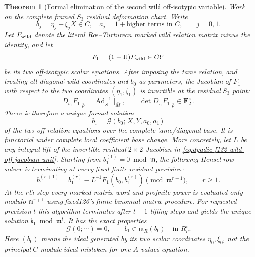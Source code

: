 \documentclass[11pt]{article}
\newtheorem{theorem}{Theorem}[section]
\theoremstyle{definition}
\begin{document}
\begin{theorem}[Formal elimination of the second wild off-isotypic variable]
\label{thm:dyadic-f132-formal-wild-elimination}
Work on the complete
framed $S_3$ residual
deformation chart.
Write
\[
b_j=\eta_j+\xi_jX\in C,
\quad
a_j=1+\text{higher terms in }C,
\qquad j=0,1.
\]
Let $F_{\rm wild}$ denote
the \emph{literal}
Roe--Turturean marked
wild relation matrix
minus the identity,
and let
\[
F_1=(1-\Pi)F_{\rm wild}
\in CY
\]
be its two
off-isotypic scalar
equations.
After imposing the
tame relation, and
treating all diagonal
wild coordinates
and $b_0$ as
parameters, the
Jacobian of $F_1$
with respect to
the two coordinates
$(\eta_1,\xi_1)$
is invertible
at the residual
$S_3$ point:
\begin{equation}\label{eq:dyadic-f132-wild-off-jacobian-unit}
\boxed{\quad
D_{b_1}F_1\big|_{\bar\rho}
=\operatorname{Ad}_{\bar S}^{-1}
\big|_{\bar M_1},
\qquad
\det D_{b_1}F_1\big|_{\bar\rho}
\in\mathbf F_2^\times.
\quad}
\end{equation}
There is therefore
a \emph{unique}
formal solution
\begin{equation}\label{eq:dyadic-f132-wild-b1-implicit-series}
\boxed{\quad
b_1=\mathcal G(b_0;\,
X,Y,a_0,a_1)
\quad}
\end{equation}
of the two off
relation equations
over the complete
tame/diagonal base.
It is functorial
under complete
local coefficient
base change.
More concretely,
let $L$ be any
integral lift of
the invertible
residual $2\times2$
Jacobian in
\eqref{eq:dyadic-f132-wild-off-jacobian-unit}.
Starting from
$b_1^{(1)}=0\bmod\mathfrak m$,
the following
\emph{Hensel row solver}
is terminating at
every fixed finite
residual precision:
\begin{equation}\label{eq:dyadic-f132-wild-hensel-row-algorithm}
\boxed{
b_1^{(r+1)}
=b_1^{(r)}
-L^{-1}F_1(b_0,b_1^{(r)})
\pmod{\mathfrak m^{r+1}},
\qquad r\ge1.
}
\end{equation}
At the $r$th step
every marked matrix
word and profinite
power is evaluated
only modulo
$\mathfrak m^{r+1}$
using fixed126's
finite binomial
matrix procedure.
For requested precision
$t$ this algorithm
terminates after
$t-1$ lifting steps
and yields the
unique solution
$b_1\bmod\mathfrak m^t$.
It has the exact
properties
\begin{equation}\label{eq:dyadic-f132-wild-b1-order}
\boxed{\quad
\mathcal G(0;\cdots)=0,
\qquad
b_1\in\mathfrak m_R(b_0)
\quad\text{in }R_{\bar\rho}^{\square}.
\quad}
\end{equation}
Here $(b_0)$ means
the ideal generated
by its two scalar
coordinates
$\eta_0,\xi_0$,
not the principal
$C$-module ideal
mistaken for one
$A$-valued equation.


\end{theorem}
\end{document}
